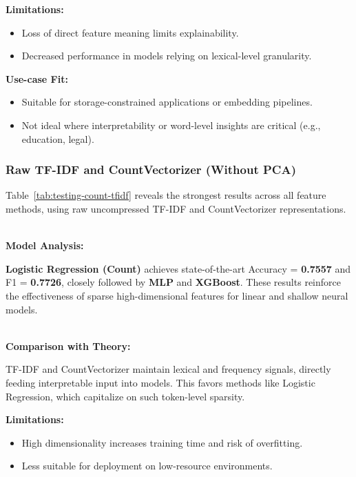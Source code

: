 \textbf{Limitations:}

\begin{itemize}
    \item Loss of direct feature meaning limits explainability.
    \item Decreased performance in models relying on lexical-level granularity.
\end{itemize}

\textbf{Use-case Fit:}

\begin{itemize}
    \item Suitable for storage-constrained applications or embedding pipelines.
    \item Not ideal where interpretability or word-level insights are critical (e.g., education, legal).
\end{itemize}

\subsubsection{Raw TF-IDF and CountVectorizer (Without PCA)}

Table~\ref{tab:testing-count-tfidf} reveals the strongest results across all feature methods, using raw uncompressed TF-IDF and CountVectorizer representations.

${}$\\
\textbf{Model Analysis:} 

\textbf{Logistic Regression (Count)} achieves state-of-the-art Accuracy = \textbf{0.7557} and F1 = \textbf{0.7726}, closely followed by \textbf{MLP} and \textbf{XGBoost}. These results reinforce the effectiveness of sparse high-dimensional features for linear and shallow neural models.

${}$\\
\textbf{Comparison with Theory:} 

TF-IDF and CountVectorizer maintain lexical and frequency signals, directly feeding interpretable input into models. This favors methods like Logistic Regression, which capitalize on such token-level sparsity.

\textbf{Limitations:}

\begin{itemize}
    \item High dimensionality increases training time and risk of overfitting.
    \item Less suitable for deployment on low-resource environments.
\end{itemize}

